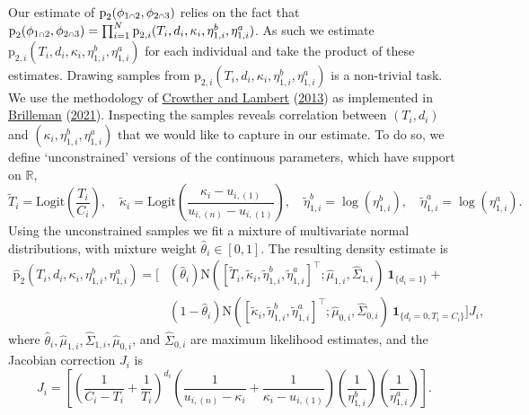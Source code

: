 \documentclass[
  10pt,
  a4paper,
]{article}
\let\Oldcap\cap
\renewcommand{\cap}{\mathrel{\mathsmaller{\Oldcap}}}
\newcommand{\pd}{\text{p}}
\begin{document}
Our estimate of \(\pd_{2}(\phi_{1 \cap 2}, \phi_{2 \cap 3})\) relies on
the fact that
\(\pd_{2}(\phi_{1 \cap 2}, \phi_{2 \cap 3}) = \prod_{i = 1}^{N}\pd_{2, i}(T_{i}, d_{i}, \kappa_{i}, \eta^{b}_{1, i}, \eta^{a}_{1, i})\).
As such we estimate
\(\pd_{2, i}(T_{i}, d_{i}, \kappa_{i}, \eta^{b}_{1, i}, \eta^{a}_{1, i})\)
for each individual and take the product of these estimates. Drawing
samples from
\(\pd_{2, i}(T_{i}, d_{i}, \kappa_{i}, \eta^{b}_{1, i}, \eta^{a}_{1, i})\)
is a non-trivial task. We use the methodology of
\protect\hyperlink{ref-crowther_simulating_2013}{Crowther and Lambert}
(\protect\hyperlink{ref-crowther_simulating_2013}{2013}) as implemented
in \protect\hyperlink{ref-brilleman_simsurv_2021}{Brilleman}
(\protect\hyperlink{ref-brilleman_simsurv_2021}{2021}). Inspecting the
samples reveals correlation between \((T_{i}, d_{i})\) and
\((\kappa_{i}, \eta^{b}_{1, i}, \eta^{a}_{1, i})\) that we would like to
capture in our estimate. To do so, we define `unconstrained' versions of
the continuous parameters, which have support on \(\mathbb{R}\),
\begin{equation}
  \tilde{T}_{i} = \text{Logit}\left(\frac{T_{i}}{C_{i}}\right), \quad
  \tilde{\kappa}_{i} = \text{Logit}\left(\frac{\kappa_{i} - u_{i, (1)}}{u_{i, (n)} - u_{i, (1)}}\right), \quad
  \tilde{\eta}^{b}_{1, i} = \log(\eta^{b}_{1, i}), \quad
  \tilde{\eta}^{a}_{1, i} = \log(\eta^{a}_{1, i}).
\end{equation} Using the unconstrained samples we fit a mixture of
multivariate normal distributions, with mixture weight
\(\widehat{\theta}_{i} \in [0, 1]\). The resulting density estimate is
\begin{align*}
  \widehat{\pd}_{2}(T_{i}, d_{i}, \kappa_{i}, \eta^{b}_{1, i}, \eta^{a}_{1, i}) =
    \Big[&(\widehat{\theta}_{i})
    \text{N}\left(\left[\tilde{T}_{i}, \tilde{\kappa}_{i}, \tilde{\eta}^{b}_{1, i}, \tilde{\eta}^{a}_{1, i} \right]^{\top}; \widehat{\mu}_{1, i}, \widehat{\Sigma}_{1, i} \right) \
    \boldsymbol{1}_{\{d_{i} = 1\}}
    + \\
    &(1 - \widehat{\theta}_{i})
    \text{N}\left(\left[\tilde{\kappa}_{i}, \tilde{\eta}^{b}_{1, i}, \tilde{\eta}^{a}_{1, i} \right]^{\top}; \widehat{\mu}_{0, i}, \widehat{\Sigma}_{0, i} \right) \
    \boldsymbol{1}_{\{d_{i} = 0, T_{i} = C_{i}\}} \Big]
    J_{i},
\end{align*} where
\(\widehat{\theta}_{i}, \widehat{\mu}_{1, i}, \widehat{\Sigma}_{1, i}, \widehat{\mu}_{0, i}\),
and \(\widehat{\Sigma}_{0, i}\) are maximum likelihood estimates, and
the Jacobian correction \(J_{i}\) is \begin{equation}
  J_{i} = \left[
    \left(
      \frac{1}{C_{i} - T_{i}} +
      \frac{1}{T_{i}}
    \right)^{d_{i}}
    \left(
      \frac{1}{u_{i, (n)} - \kappa_{i}} +
      \frac{1}{\kappa_{i} - u_{i, (1)}}
    \right)
    \left(
      \frac{1}{\eta^{b}_{1, i}}
    \right)
    \left(
      \frac{1}{\eta^{a}_{1, i}}
    \right)
  \right].
\end{equation}
\end{document}
